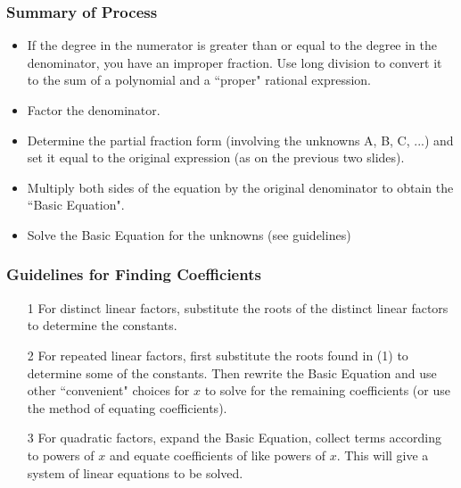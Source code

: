 \begin{frame}\frametitle{Summary of Process}
\begin{itemize}
\item If the degree in the numerator is greater than or equal to the degree in the denominator, you have an improper fraction.  Use long division to convert it to the sum of a polynomial and a ``proper" rational expression.

\item Factor the denominator.
\item Determine the partial fraction form (involving the unknowns A, B, C, ...) and set it  equal to the original expression (as on the previous two slides).
\item Multiply both sides of the equation by the original denominator to obtain the ``Basic Equation".
\item Solve the Basic Equation for the unknowns (see guidelines)
\end{itemize}
\end{frame}

\begin{frame}\frametitle{Guidelines for Finding Coefficients}
\begin{itemize}
\item[1] For distinct linear factors, substitute the roots of the distinct linear factors to determine the constants.
\item[2] For repeated linear factors, first substitute the roots found in (1) to determine some of the constants.  Then rewrite the Basic Equation and use other ``convenient" choices for $ x $ to solve for the remaining coefficients (or use the method of equating coefficients).
\item[3] For quadratic factors, expand the Basic Equation, collect terms according to powers of $ x $ and equate coefficients of like powers of $ x $.  This will give a system of linear equations to be solved. 
\end{itemize}

\end{frame}
